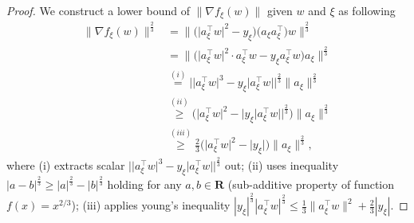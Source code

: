 \documentclass[10pt]{article} %
\newtheorem{proof}{Proof}
\begin{document}
\begin{proof}
We construct a lower bound of $\|\nabla f_{\xi}(w)\|$ given $w$ and $\xi$ as following
\begin{align}
\big\|\nabla f_{\xi}(w)\big\|^{\frac{2}{3}} 
& =\big\|\big(\big|a_{\xi}^{\top} w\big|^2-y_{\xi}\big)\big(a_{\xi} a_{\xi}^{\top}\big) w\big\|^{\frac{2}{3}} \nonumber\\
& \overset{}{=}  \big\|\big(\big|a_{\xi}^{\top} w\big|^2\cdot a_{\xi}^{\top}w-y_{\xi}a_{\xi}^{\top}w\big)a_{\xi}\big\|^{\frac{2}{3}}\nonumber \\
& \overset{(i)}{=} \Big| \big| a_{\xi}^{\top} w\big|^3-y_{\xi}\big|a_{\xi}^{\top} w\big|\Big|^{\frac{2}{3}}\big\|a_{\xi}\big\|^{\frac{2}{3}} \nonumber\\
& \overset{(ii)}{\geq} \big(\big|a_{\xi}^{\top} w\big|^2-\Big|y_{\xi} \big| a_{\xi}^{\top} w \big| \Big|^{\frac{2}{3}}\big)\big\|a_{\xi}\big\|^{\frac{2}{3}} \nonumber\\
& \overset{(iii)}{\geq} \frac{2}{3}\big(\big|a_{\xi}^{\top} w\big|^2-\big|y_{\xi}\big|\big)\big\|a_{\xi}\big\|^{\frac{2}{3}},
\label{PRgradient}
\end{align}
where (i) extracts scalar $\Big| \big| a_{\xi}^{\top} w\big|^3-y_{\xi}\big|a_{\xi}^{\top} w\big|\Big|^{\frac{2}{3}}$ out; (ii) uses inequality $|a-b|^{\frac{2}{3}}\geq |a|^{\frac{2}{3}}-|b|^{\frac{2}{3}}$ holding for any $a,b\in \mathbf{R}$ (sub-additive property of function $f(x)=x^{2/3}$); (iii)  applies young's inequality $|y_{\xi}|^{\frac{2}{3}}|a_{\xi}^{\top}w|^{\frac{2}{3}}\leq \frac{1}{3}\|a_{\xi}^{\top}w\|^2+\frac{2}{3}|y_{\xi}|$.


\end{proof}
\end{document}
